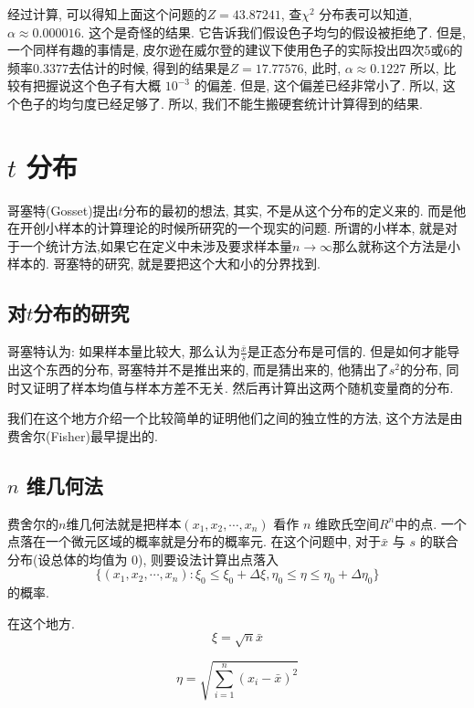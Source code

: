			经过计算, 可以得知上面这个问题的$Z = 43.87241$, 查$\chi^2$ 分布表可以知道, $\alpha\approx 0.000016$. 这个是奇怪的结果. 它告诉我们假设色子均匀的假设被拒绝了. 但是, 一个同样有趣的事情是, 皮尔逊在威尔登的建议下使用色子的实际投出四次5或6的频率$0.3377$去估计的时候, 得到的结果是$Z = 17.77576$, 此时, $\alpha \approx 0.1227$ 所以, 比较有把握说这个色子有大概 $10^{-3}$ 的偏差.
			但是, 这个偏差已经非常小了. 所以, 这个色子的均匀度已经足够了. 所以, 我们不能生搬硬套统计计算得到的结果. 
			
			 
	\section{$t$ 分布}
		哥塞特(Gosset)提出$t$分布的最初的想法, 其实, 不是从这个分布的定义来的. 而是他在开创小样本的计算理论的时候所研究的一个现实的问题. 所谓的小样本, 就是对于一个统计方法,如果它在定义中未涉及要求样本量$n\rightarrow \infty$那么就称这个方法是小样本的. 哥塞特的研究, 就是要把这个大和小的分界找到.
		
		\subsection{对$t$分布的研究}
			哥塞特认为: 如果样本量比较大, 那么认为$\frac{\bar{x}}{s}$是正态分布是可信的.
			但是如何才能导出这个东西的分布, 哥塞特并不是推出来的, 而是猜出来的, 他猜出了$s^2$的分布, 同时又证明了样本均值与样本方差不无关. 然后再计算出这两个随机变量商的分布.
			
			我们在这个地方介绍一个比较简单的证明他们之间的独立性的方法, 这个方法是由费舍尔(Fisher)最早提出的. 
		\subsection{$n$ 维几何法}
			费舍尔的$n$维几何法就是把样本$(x_1, x_2, \cdots, x_n)$ 看作 $n$ 维欧氏空间$R^n$中的点. 一个点落在一个微元区域的概率就是分布的概率元. 在这个问题中, 对于$\bar{x}$ 与 $s$ 的联合分布(设总体的均值为 0), 则要设法计算出点落入			
			\begin{equation} \label{ndgeometry}
				\{(x_1, x_2, \cdots, x_n): \xi_0 \le \xi_0 + \Delta \xi, \eta_0 \le \eta \le \eta_0 + \Delta \eta_0 \}
			\end{equation} 的概率.
			
			在这个地方.
			\begin{equation}
				\xi = \sqrt{n} \bar{x}
			\end{equation}
			
			\begin{equation}
				\eta = \sqrt{\sum_{i=1}^n (x_i - \bar{x})^2}
			\end{equation}
			
